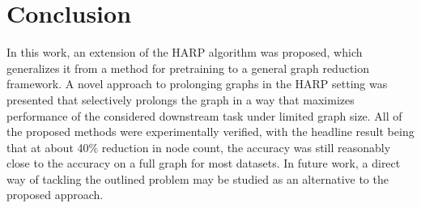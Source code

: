\section{Conclusion}

In this work, an extension of the HARP algorithm was proposed, which generalizes it from a method for pretraining to a general graph reduction framework. A novel approach to prolonging graphs in the HARP setting was presented that selectively prolongs the graph in a way that maximizes performance of the considered downstream task under limited graph size. All of the proposed methods were experimentally verified, with the headline result being that at about 40\% reduction in node count, the accuracy was still reasonably close to the accuracy on a full graph for most datasets. In future work, a direct way of tackling the outlined problem may be studied as an alternative to the proposed approach.
